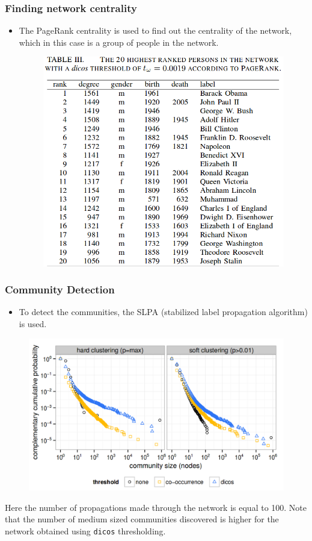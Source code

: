 \documentclass[9pt, compress]{beamer}
\begin{document}
\begin{frame}[fragile]
	\frametitle{Finding network centrality}
\vspace{-5mm}
\begin{itemize}
\item The PageRank centrality is used to find out the centrality of the network, which in this case is a group of people in the network.
\begin{figure}
	\centering
    \includegraphics[width=0.7\linewidth]{img/network-centre.png}
\end{figure}
\end{itemize}
\end{frame}

\begin{frame}[fragile]
	\frametitle{Community Detection}
\vspace{-5mm}
\begin{itemize}
\item To detect the communities, the SLPA (stabilized label propagation algorithm) is used.
\end{itemize}
\begin{figure}
	\centering
    \includegraphics[width=0.8\linewidth]{img/comm-pdf.png}
\end{figure}
\begin{center}
Here the number of propagations made through the network is equal to 100. Note that the number of medium sized communities discovered is higher for the network obtained using \texttt{dicos} thresholding.
\end{center}
\end{frame}
\end{document}
